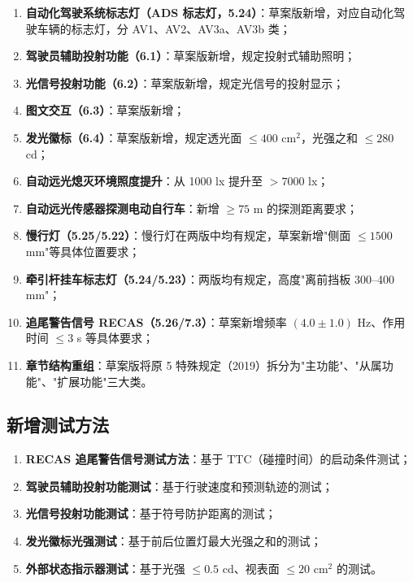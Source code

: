 \begin{enumerate}[leftmargin=2em]
    \item \textbf{自动化驾驶系统标志灯（ADS 标志灯，5.24）}：草案版新增，对应自动化驾驶车辆的标志灯，分 AV1、AV2、AV3a、AV3b 类；
    \item \textbf{驾驶员辅助投射功能（6.1）}：草案版新增，规定投射式辅助照明；
    \item \textbf{光信号投射功能（6.2）}：草案版新增，规定光信号的投射显示；
    \item \textbf{图文交互（6.3）}：草案版新增；
    \item \textbf{发光徽标（6.4）}：草案版新增，规定透光面 $\le 400$ cm$^2$，光强之和 $\le 280$ cd；
    \item \textbf{自动远光熄灭环境照度提升}：从 1000 lx 提升至 $> 7000$ lx；
    \item \textbf{自动远光传感器探测电动自行车}：新增 $\ge 75$ m 的探测距离要求；
    \item \textbf{慢行灯（5.25/5.22）}：慢行灯在两版中均有规定，草案新增"侧面 $\le 1500$ mm"等具体位置要求；
    \item \textbf{牵引杆挂车标志灯（5.24/5.23）}：两版均有规定，高度"离前挡板 300--400 mm"；
    \item \textbf{追尾警告信号 RECAS（5.26/7.3）}：草案新增频率 $(4.0 \pm 1.0)$ Hz、作用时间 $\le 3$ s 等具体要求；
    \item \textbf{章节结构重组}：草案版将原 5 特殊规定（2019）拆分为"主功能"、"从属功能"、"扩展功能"三大类。
\end{enumerate}

\subsection{新增测试方法}

\begin{enumerate}[leftmargin=2em]
    \item \textbf{RECAS 追尾警告信号测试方法}：基于 TTC（碰撞时间）的启动条件测试；
    \item \textbf{驾驶员辅助投射功能测试}：基于行驶速度和预测轨迹的测试；
    \item \textbf{光信号投射功能测试}：基于符号防护距离的测试；
    \item \textbf{发光徽标光强测试}：基于前后位置灯最大光强之和的测试；
    \item \textbf{外部状态指示器测试}：基于光强 $\le 0.5$ cd、视表面 $\le 20$ cm$^2$ 的测试。
\end{enumerate}

